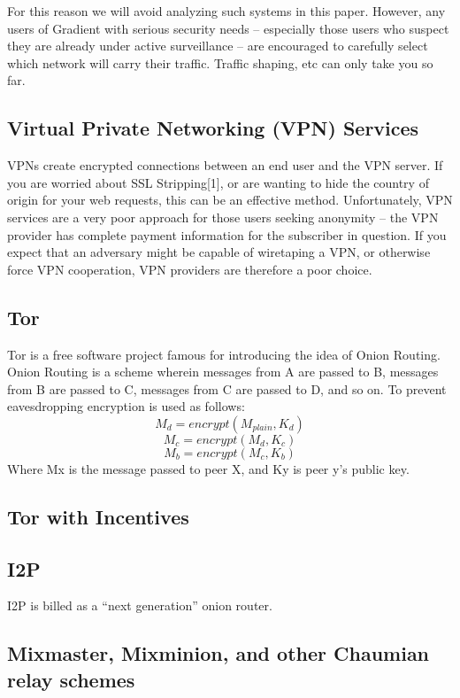 \documentclass{article}
\begin{document}
For this reason we will avoid analyzing such systems in this paper. However, any users of Gradient with serious security needs – especially those users who suspect they are already under active surveillance – are encouraged to carefully select which network will carry their traffic. Traffic shaping, etc can only take you so far.

\subsection{Virtual Private Networking (VPN) Services}

VPNs create encrypted connections between an end user and the VPN server. If you are worried about SSL Stripping[1], or are wanting to hide the country of origin for your web requests, this can be an effective method. Unfortunately, VPN services are a very poor approach for those users seeking anonymity – the VPN provider has complete payment information for the subscriber in question. If you expect that an adversary might be capable of wiretaping a VPN, or otherwise force VPN cooperation, VPN providers are therefore a poor choice.

\subsection{Tor}

Tor is a free software project famous for introducing the idea of Onion Routing. Onion Routing is a scheme wherein messages from A are passed to B, messages from B are passed to C, messages from C are passed to D, and so on. To prevent eavesdropping encryption is used as follows:
$$M_d = encrypt(M_{plain}, K_d)$$
$$M_c = encrypt(M_d, K_c)$$
$$M_b = encrypt(M_c, K_b)$$
Where Mx is the message passed to peer X, and Ky is peer y’s public key.

\subsection{Tor with Incentives}

\subsection{I2P}

I2P is billed as a “next generation” onion router.

\subsection{Mixmaster, Mixminion, and other Chaumian relay schemes}
\end{document}
